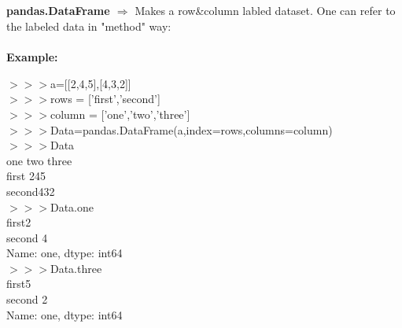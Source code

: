 \documentclass[a4paper,18pt]{article}
\begin{document}

\subsection{\colorbox {matgreen}{\color{white}{\large pandas.DataFrame(data=Data, index = rowlabels , columns = column labels)}}}
\textbf{pandas.DataFrame $\Rightarrow$} Makes a row\&column labled dataset. One can refer to the labeled data in "method" way:\\\\
\textbf{Example:\\}

$>>>$a=[[2,4,5],[4,3,2]]\\

$>>>$rows = ['first','second']\\

$>>>$column = ['one','two','three']\\

$>>>$Data=pandas.DataFrame(a,index=rows,columns=column)\\

$>>>$Data\\

\hspace{14pt} one  two  three\\
first \hspace*{16pt}2\hspace*{14pt}4\hspace*{14pt}5\\
second\hspace*{8pt}4\hspace*{14pt}3\hspace*{14pt}2\\

$>>>$Data.one\\

first\hspace*{14pt}2\\
\hspace*{14pt}second    4\\
\hspace*{14pt}Name: one, dtype: int64\\

$>>>$Data.three\\

first\hspace*{14pt}5\\
\hspace*{14pt}second    2\\
\hspace*{14pt}Name: one, dtype: int64\\
\end{document}
